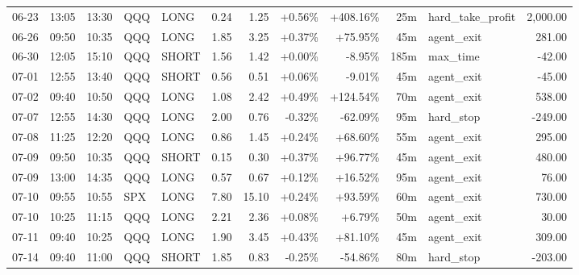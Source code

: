 \documentclass[11pt,a4paper,twoside]{article}
\begin{document}
\begin{center}
\begin{longtable}{>{\color{txtmain}}l l l l l r r r r r >{\color{txtmain}}l r}
06-23 & 13:05 & 13:30 & QQQ & LONG & 0.24 & 1.25 & \textcolor{wingreen}{+0.56\%} & \textcolor{wingreen}{+408.16\%} & 25m & hard\_take\_profit & \textcolor{wingreen}{2,000.00} \\
06-26 & 09:50 & 10:35 & QQQ & LONG & 1.85 & 3.25 & \textcolor{wingreen}{+0.37\%} & \textcolor{wingreen}{+75.95\%} & 45m & agent\_exit & \textcolor{wingreen}{281.00} \\
06-30 & 12:05 & 15:10 & QQQ & SHORT & 1.56 & 1.42 & \textcolor{wingreen}{+0.00\%} & \textcolor{lossred}{-8.95\%} & 185m & max\_time & \textcolor{lossred}{-42.00} \\
07-01 & 12:55 & 13:40 & QQQ & SHORT & 0.56 & 0.51 & \textcolor{wingreen}{+0.06\%} & \textcolor{lossred}{-9.01\%} & 45m & agent\_exit & \textcolor{lossred}{-45.00} \\
07-02 & 09:40 & 10:50 & QQQ & LONG & 1.08 & 2.42 & \textcolor{wingreen}{+0.49\%} & \textcolor{wingreen}{+124.54\%} & 70m & agent\_exit & \textcolor{wingreen}{538.00} \\
07-07 & 12:55 & 14:30 & QQQ & LONG & 2.00 & 0.76 & \textcolor{lossred}{-0.32\%} & \textcolor{lossred}{-62.09\%} & 95m & hard\_stop & \textcolor{lossred}{-249.00} \\
07-08 & 11:25 & 12:20 & QQQ & LONG & 0.86 & 1.45 & \textcolor{wingreen}{+0.24\%} & \textcolor{wingreen}{+68.60\%} & 55m & agent\_exit & \textcolor{wingreen}{295.00} \\
07-09 & 09:50 & 10:35 & QQQ & SHORT & 0.15 & 0.30 & \textcolor{wingreen}{+0.37\%} & \textcolor{wingreen}{+96.77\%} & 45m & agent\_exit & \textcolor{wingreen}{480.00} \\
07-09 & 13:00 & 14:35 & QQQ & LONG & 0.57 & 0.67 & \textcolor{wingreen}{+0.12\%} & \textcolor{wingreen}{+16.52\%} & 95m & agent\_exit & \textcolor{wingreen}{76.00} \\
07-10 & 09:55 & 10:55 & SPX & LONG & 7.80 & 15.10 & \textcolor{wingreen}{+0.24\%} & \textcolor{wingreen}{+93.59\%} & 60m & agent\_exit & \textcolor{wingreen}{730.00} \\
07-10 & 10:25 & 11:15 & QQQ & LONG & 2.21 & 2.36 & \textcolor{wingreen}{+0.08\%} & \textcolor{wingreen}{+6.79\%} & 50m & agent\_exit & \textcolor{wingreen}{30.00} \\
07-11 & 09:40 & 10:25 & QQQ & LONG & 1.90 & 3.45 & \textcolor{wingreen}{+0.43\%} & \textcolor{wingreen}{+81.10\%} & 45m & agent\_exit & \textcolor{wingreen}{309.00} \\
07-14 & 09:40 & 11:00 & QQQ & SHORT & 1.85 & 0.83 & \textcolor{lossred}{-0.25\%} & \textcolor{lossred}{-54.86\%} & 80m & hard\_stop & \textcolor{lossred}{-203.00} \\

\end{longtable}
\end{center}
\end{document}
